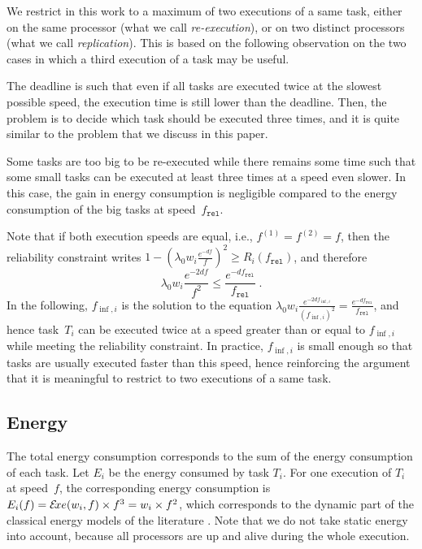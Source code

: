 \documentclass[a4paper]{article}
\theoremstyle{plain}
\theoremstyle{definition}
\theoremstyle{remark}
\newcommand{\finf}{\ensuremath{f_{\inf,i}}\xspace}
\newcommand{\fr}{\ensuremath{f_{\texttt{rel}}}\xspace}
\begin{document}
We restrict in this work to a maximum of two executions of a same task,
either on the same processor (what we call {\em re-execution}), or on
two distinct processors (what we call {\em replication}).  This is
based on the following observation on the two cases in which a third
execution of a task may be useful. 
\begin{compactenum}
\item The deadline is such that even if all tasks are executed
  twice at the slowest possible speed, the execution time is still
  lower than the deadline. Then, the problem is to decide which task
  should be executed three times, and it is quite similar to the
  problem that we discuss in this paper. 
\item Some tasks are too big to be re-executed while there remains
  some time such that some small tasks can be executed at least three
  times at a speed even slower. In this case, the gain in energy
  consumption is negligible compared to the energy consumption of the
  big tasks at speed~\fr.
\end{compactenum}


Note that if both execution speeds are equal, i.e.,
$f^{(1)}=f^{(2)}=f$, then the reliability constraint writes
$1-(\lambda_0 w_i\frac{ e^{-df}}{f})^2 \geq R_{i}(\fr)$, and
therefore $$\lambda_0 w_i \frac{ e^{-2df}}{f^2} \leq \frac{
  e^{-d\fr}}{\fr}\; .$$ In the following, $\finf$ is the solution to
the equation $\lambda_0 w_i \frac{e^{-2d\finf}}{(\finf)^{2}} =
\frac{e^{-d\fr}}{\fr}$, and hence task~$T_i$ can be executed twice at
a speed greater than or equal to $\finf$ while meeting the reliability
constraint. In practice, $\finf$ is small enough so that tasks are
usually executed faster than this speed, hence reinforcing the
argument that it is meaningful to restrict to two executions of a same
task. 


\subsection{Energy}


The total energy consumption corresponds to the sum of the energy
consumption of each task. Let $E_i$ be the energy consumed by
task $T_i$. For one execution of $T_i$ at speed~$f$, the
corresponding energy consumption is $E_i(f) =\mathcal{E}\!xe(w_i,f) \times f^3 =
w_i \times f^2$, which corresponds to the dynamic part of the
classical energy models of the literature \cite{pow3IPDPS,BKP07}.  
Note that we do not take static energy into account, because all 
processors are up and alive during the whole execution.
\end{document}
